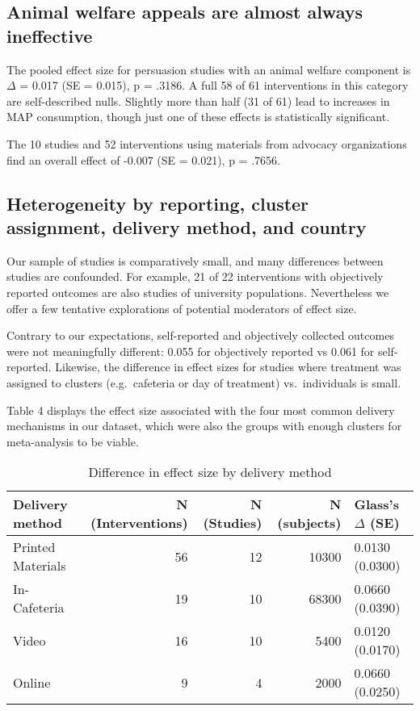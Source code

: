 \documentclass[sn-nature,pdflatex]{sn-jnl}
\begin{document}
\subsection{Animal welfare appeals are almost always
ineffective}\label{sec2.8}

The pooled effect size for persuasion studies with an animal welfare
component is \(\Delta\) = 0.017 (SE = 0.015), p = .3186. A full 58 of 61
interventions in this category are self-described nulls. Slightly more
than half (31 of 61) lead to increases in MAP consumption, though just
one of these effects is statistically significant.

The 10 studies and 52 interventions using materials from advocacy
organizations find an overall effect of -0.007 (SE = 0.021), p = .7656.

\subsection{Heterogeneity by reporting, cluster assignment, delivery
method, and country}\label{sec2.9}

Our sample of studies is comparatively small, and many differences
between studies are confounded. For example, 21 of 22 interventions with
objectively reported outcomes are also studies of university
populations. Nevertheless we offer a few tentative explorations of
potential moderators of effect size.

Contrary to our expectations, self-reported and objectively collected
outcomes were not meaningfully different: 0.055 for objectively reported
vs 0.061 for self-reported. Likewise, the difference in effect sizes for
studies where treatment was assigned to clusters (e.g.~cafeteria or day
of treatment) vs.~individuals is small.

Table 4 displays the effect size associated with the four most common
delivery mechanisms in our dataset, which were also the groups with
enough clusters for meta-analysis to be viable.

\begin{table}[!h]
\centering
\caption{\label{tab:table_four}Difference in effect size by delivery method}
\centering
\begin{tabular}[t]{lrrrl}
\toprule
Delivery method & N (Interventions) & N (Studies) & N (subjects) & Glass's $\Delta$ (SE)\\
\midrule
Printed Materials & 56 & 12 & 10300 & 0.0130 (0.0300)\\
In-Cafeteria & 19 & 10 & 68300 & 0.0660 (0.0390)\\
Video & 16 & 10 & 5400 & 0.0120 (0.0170)\\
Online & 9 & 4 & 2000 & 0.0660 (0.0250)\\
\bottomrule
\end{tabular}
\end{table}
\end{document}
